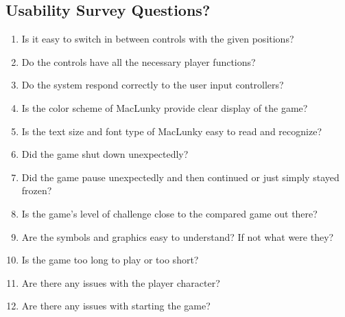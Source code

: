\documentclass[12pt, titlepage]{article}
\begin{document}
\subsection{Usability Survey Questions?}

\begin{enumerate}
    \item Is it easy to switch in between controls with the given positions?
    \item Do the controls have all the necessary player functions?
    \item Do the system respond correctly to the user input controllers?
    \item Is the color scheme of MacLunky provide clear display of the game?
    \item Is the text size and font type of MacLunky easy to read and recognize?
    \item Did the game shut down unexpectedly?
    \item Did the game pause unexpectedly and then continued or just simply stayed frozen? 
    \item Is the game's level of challenge close to the compared game out there?
    \item Are the symbols and graphics easy to understand? If not what were they?
    \item Is the game too long to play or too short?
    \item Are there any issues with the player character?
    \item Are there any issues with starting the game?
\end{enumerate}
\end{document}
